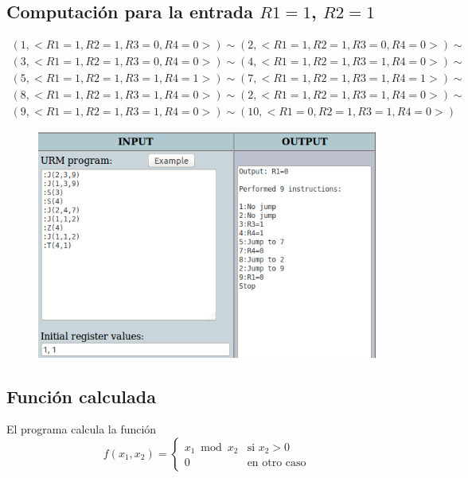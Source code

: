 	\subsection{Computación para la entrada $R1=1$, $R2=1$}
	\begin{equation*}\begin{gathered}
	(1, <R1=1, R2=1, R3=0, R4=0>) \sim (2, <R1=1, R2=1, R3=0, R4=0>) \sim\\
	(3, <R1=1, R2=1, R3=0, R4=0>) \sim (4, <R1=1, R2=1, R3=1, R4=0>) \sim\\
	(5, <R1=1, R2=1, R3=1, R4=1>) \sim (7, <R1=1, R2=1, R3=1, R4=1>) \sim\\
	(8, <R1=1, R2=1, R3=1, R4=0>) \sim (2, <R1=1, R2=1, R3=1, R4=0>) \sim\\
	(9, <R1=1, R2=1, R3=1, R4=0>) \sim (10, <R1=0, R2=1, R3=1, R4=0>)
	\end{gathered}\end{equation*}
	\begin{figure}[H]
  		\centering
  		\includegraphics[scale=0.5]{images/711.png}
  	\end{figure}
	\subsection{Función calculada}
	El programa calcula la función
	\begin{equation*}
		f(x_1, x_2)= \left\{ 
  		\begin{array}{rl}
  				x_1 \bmod x_2 & \text{si } x_2>0 \\
  				0 & \text{en otro caso} 
  		\end{array} \right.
	\end{equation*}
